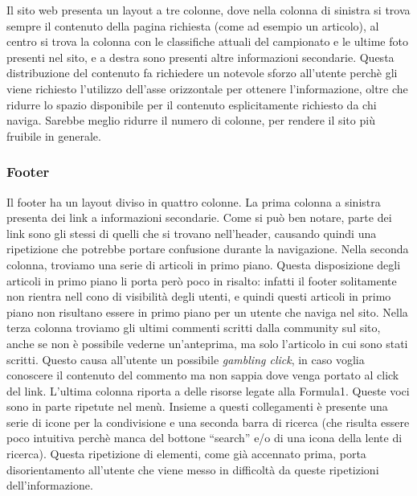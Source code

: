Il sito web presenta un layout a tre colonne, dove nella colonna di sinistra si trova sempre il contenuto della pagina richiesta (come ad esempio un articolo), al centro si trova la colonna con le classifiche attuali del campionato e le ultime foto presenti nel sito, e a destra sono presenti altre informazioni secondarie. Questa distribuzione del contenuto fa richiedere un notevole sforzo all'utente perch\`e gli viene richiesto l'utilizzo dell'asse orizzontale per ottenere l'informazione, oltre che ridurre lo spazio disponibile per il contenuto esplicitamente richiesto da chi naviga. Sarebbe meglio ridurre il numero di colonne, per rendere il sito pi\`u fruibile in generale.

\subsubsection{Footer}

Il footer ha un layout diviso in quattro colonne. La prima colonna a sinistra presenta dei link a informazioni secondarie. Come si può ben notare, parte dei link sono gli stessi di quelli che si trovano nell'header, causando quindi una ripetizione che potrebbe portare confusione durante la navigazione.
Nella seconda colonna, troviamo una serie di articoli in primo piano. Questa disposizione degli articoli in primo piano li porta però poco in risalto: infatti il footer solitamente non rientra nell cono di visibilità degli utenti, %
e quindi questi articoli in primo piano non risultano essere in primo piano per un utente che naviga nel sito.
Nella terza colonna troviamo gli ultimi commenti scritti dalla community sul sito, anche se non è possibile vederne un'anteprima, ma solo l'articolo in cui sono stati scritti. Questo causa all'utente un possibile \textit{gambling click}, in caso voglia conoscere il contenuto del commento ma non sappia dove venga portato al click del link.
L'ultima colonna riporta a delle risorse legate alla Formula1. Queste voci sono in parte ripetute nel menù. Insieme a questi collegamenti è presente una serie di icone per la condivisione e una seconda barra di ricerca (che risulta essere poco intuitiva perchè manca del bottone ``search'' e/o di una icona della lente di ricerca). Questa ripetizione di elementi, come già accennato prima, porta disorientamento all'utente che viene messo in difficoltà da queste ripetizioni dell'informazione.
